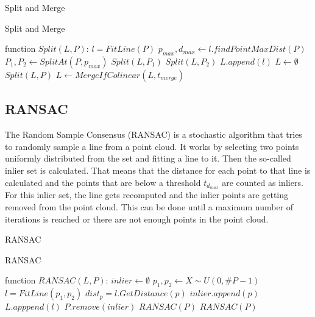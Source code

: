 \documentclass{scp}
\begin{document}
\begin{algorithm}[h]
\caption{Split and Merge}\label{Split}
\begin{algorithmic}[1]
\caption{Split and Merge}
\State function $Split(L,P)$:
    \State $l = FitLine(P)$
    \State $p_{max}, d_{max} \leftarrow l.findPointMaxDist(P)$
        \State $P_1, P_2 \leftarrow SplitAt(P,p_{max})$
        \State $Split(L,P_1)$
        \State $Split(L,P_2)$
    \Else
        \State $L.append(l)$
    \EndIf
\State
\State $L \leftarrow \emptyset$
\State $Split(L,P)$
\State $L \leftarrow MergeIfColinear(L, t_{merge})$
\end{algorithmic}
\end{algorithm}

\subsection*{RANSAC} \label{sec:ransac}
The Random Sample Consensus (RANSAC) \cite{Nguyen} is a stochastic algorithm that tries to randomly sample a line from a point cloud. It works by selecting two points uniformly distributed from the set and fitting a line to it. Then the so-called inlier set is calculated. That means that the distance for each point to that line is calculated and the points that are below a threshold $t_{d_{max}}$ are counted as inliers. For this inlier set, the line gets recomputed and the inlier points are getting removed from the point cloud. This can be done until a maximum number of iterations is reached or there are not enough points in the point cloud.


\begin{algorithm}[h]
\caption{RANSAC}\label{ransac}
\begin{algorithmic}[1]
\caption{RANSAC}
\State function $RANSAC(L,P)$:
    \State \Return
\EndIf
\State $inlier \leftarrow \emptyset$
\State $p_1,p_2 \leftarrow X \sim U(0,\#P-1)$
\State $l = FitLine(p_1,p_2)$
    \State $dist_p = l.GetDistance(p)$
        \State $inlier.append(p)$
    \EndIf
\EndFor
{}
    \State $L.apppend(l)$
    \State $P.remove(inlier)$
    \State $RANSAC(P)$
\Else
    \State $RANSAC(P)$
\EndIf
\end{algorithmic}
\end{algorithm}
\end{document}
